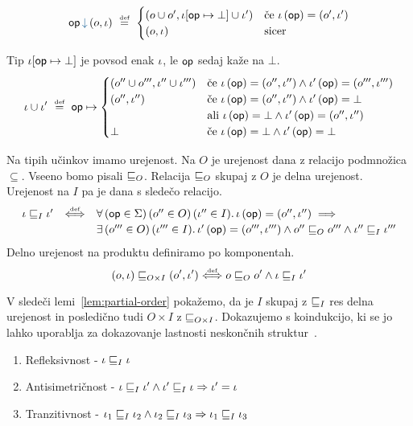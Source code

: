 $$\opincomp{op}{(\o, \i)}~\defeq~
\begin{cases}
	\left(\o \cup \o' , \i[\op \mapsto \bot] \cup \i' \right) & \mbox{če } \i\, (\op) = (\o',\i')\\
	(\o,\i) & \mbox{sicer} 
\end{cases}$$

Tip $\iota[\mathsf{op} \mapsto \bot]$ je povsod enak $\iota$, le $\mathsf{op}$ sedaj kaže na $\bot$.
$$
\iota \cup \iota'
~\mathrel{\overset{\text{\tiny def}}{=}}~
\mathsf{op} \mapsto 
\begin{cases}
	(o'' \cup o''' , \iota'' \cup \iota''') & \mbox{če } \iota\, (\mathsf{op}) = (o'',\iota'') \wedge \iota'\, (\mathsf{op}) = (o''',\iota''') \\
	(o'' , \iota'') & \mbox{če } \iota\, (\mathsf{op}) = (o'',\iota'') \wedge \iota'\, (\mathsf{op}) = \bot \\
	              & \mbox{ali } \iota\, (\mathsf{op}) = \bot \wedge \iota'\, (\mathsf{op}) = (o'',\iota'') \\
	\bot & \mbox{če } \iota\, (\mathsf{op}) = \bot \wedge \iota'\, (\mathsf{op}) = \bot \\
\end{cases}
$$

Na tipih učinkov imamo urejenost. Na $O$ je urejenost dana z relacijo podmnožica $\subseteq$. Vseeno bomo pisali $\sqsubseteq_{O}$. Relacija $\sqsubseteq_{O}$ skupaj z $O$ je delna urejenost.
Urejenost na $I$ pa je dana s sledečo relacijo.
$$
\begin{array}{l c l}
	\iota \sqsubseteq_{I} \iota'
	&
	\mathrel{\overset{\text{\tiny def}}{\Longleftrightarrow}}
	&
	\forall\, (\mathsf{op} \in \Sigma) \, (o'' \in O) \, (\iota'' \in I) .\, \iota\, (\mathsf{op}) = ({o''} , {\iota''}) \implies 
	\\[0.5ex]
	&& \exists\, (o''' \in O) \, (\iota''' \in I) .\, \iota'\, (\mathsf{op}) = ({o'''} , {\iota'''}) \wedge o'' \sqsubseteq_{O} o''' \wedge \iota'' \sqsubseteq_{I} \iota'''
\end{array}
$$
Delno urejenost na produktu definiramo po komponentah.
$$(o, \iota) \sqsubseteq_{O \times I} (o', \iota') \mathrel{\overset{\text{\tiny def}}{\Longleftrightarrow}} o \sqsubseteq_{O} o' \wedge \iota \sqsubseteq_{I} \iota'$$

V sledeči lemi~\ref{lem:partial-order} pokažemo, da je $I$ skupaj z $\sqsubseteq_{I}$ res delna urejenost in posledično tudi $O \times I$ z $\sqsubseteq_{O \times I}$.
Dokazujemo s koindukcijo, ki se jo lahko uporablja za dokazovanje lastnosti neskončnih struktur~\cite{coinduction}. 

\begin{lema}\label{lem:partial-order}
	\begin{enumerate}
		\item Refleksivnost - $\iota \sqsubseteq_{I} \iota$
		\item Antisimetričnost - $\iota \sqsubseteq_{I} \iota' \wedge \iota' \sqsubseteq_{I} \iota \Rightarrow \iota' = \iota$
		\item Tranzitivnost - $\iota_1 \sqsubseteq_{I} \iota_2 \wedge \iota_2 \sqsubseteq_{I} \iota_3 \Rightarrow \iota_1 \sqsubseteq_{I} \iota_3$
	\end{enumerate}
\end{lema}

